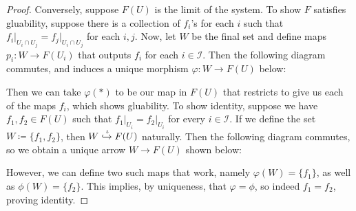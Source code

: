 \documentclass{article}
\newcommand{\fI}{\mathscr{I}}
\DeclareMathOperator{\res}{res}
\begin{document}
\begin{proof}
   \vspace{\baselineskip}
    \noindent Conversely, suppose $F(U)$ is the limit of the system. To show $F$ satisfies gluability, suppose there is a collection of $f_i$'s for each $i$ such that $f_i\vert_{U_i \cap U_j}=f_j\vert_{U_i \cap U_j}$ for each $i,j$. Now, let $W$ be the final set and define maps $p_i:W\to F(U_i)$ that outputs $f_i$ for each $i\in \fI$. Then the following diagram commutes, and induces a unique morphism $\varphi:W\to F(U)$ below:
   \begin{center}
   \end{center}
   Then we can take $\varphi(\ast)$ to be our map in $F(U)$ that restricts to give us each of the maps $f_i$, which shows gluability. To show identity, suppose we have $f_1,f_2\in F(U)$ such that $f_1\vert_{U_i}=f_2\vert_{U_i}$ for every $i\in \fI$. If we define the set $W\coloneqq \{f_1,f_2\}$, then $W\xhookrightarrow{\iota} F(U)$ naturally. Then the following diagram commutes, so we obtain a unique arrow $W\to F(U)$ shown below:
   \begin{center}
   \end{center}
   However, we can define two such maps that work, namely $\varphi(W)=\{f_1\}$, as well as $\phi(W)=\{f_2\}$. This implies, by uniqueness, that $\varphi=\phi$, so indeed $f_1=f_2$, proving identity.
\end{proof}
\end{document}
